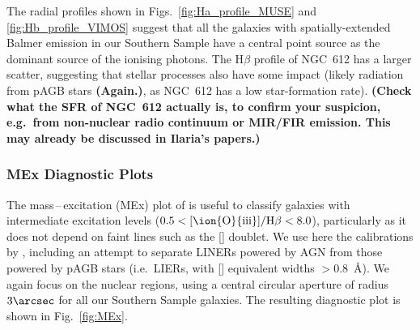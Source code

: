 \documentclass[a4paper,fleqn,usenatbib]{mnras}
\begin{document}
The radial profiles shown in Figs.~\ref{fig:Ha_profile_MUSE} and
\ref{fig:Hb_profile_VIMOS} suggest that all the galaxies with
spatially-extended Balmer emission in our Southern Sample have a
central point source as the dominant source of the ionising
photons. The H$\beta$ profile of NGC~612 has a larger scatter,
suggesting that stellar processes also have some impact (likely
radiation from pAGB stars {\bf (Again.)}, as NGC~612 has a low
star-formation rate). {\bf (Check what the SFR of NGC~612 actually is,
  to confirm your suspicion, e.g.\ from non-nuclear radio continuum or
  MIR/FIR emission. This may already be discussed in Ilaria's
  papers.)}

\subsubsection{MEx Diagnostic Plots}
\label{subsubsec:MEx}

The mass\,--\,excitation (MEx) plot of \citet{Juneau2011} is useful to
classify galaxies with intermediate excitation levels
($0.5<\mathrm{[\ion{O}{iii}]/H\beta}<8.0$), particularly as it does
not depend on faint lines such as the [] doublet. We use
here the calibrations by \citet{Nyland2016}, including an attempt to
separate LINERs powered by AGN from those powered by pAGB stars (i.e.\
LIERs, with [] equivalent widths $>0.8$~\AA). We again
focus on the nuclear regions, using a central circular aperture of
radius $3\arcsec$ for all our Southern Sample galaxies. The resulting
diagnostic plot is shown in Fig.~\ref{fig:MEx}.
\end{document}
